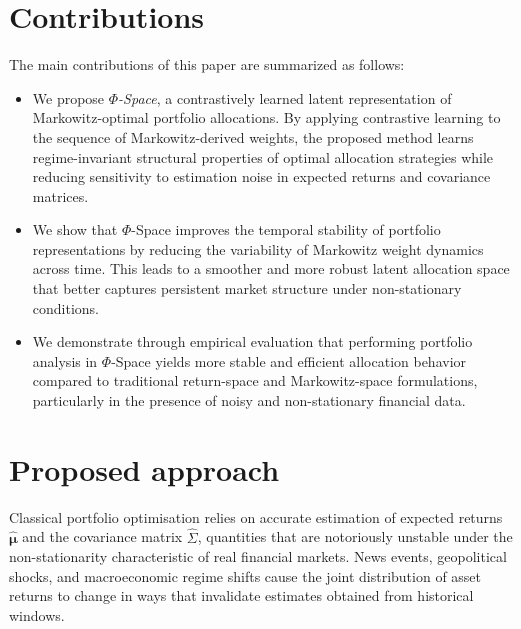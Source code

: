 \documentclass[preprint,12pt]{elsarticle}
\theoremstyle{plain}
\theoremstyle{definition}
\newcommand{\bmu}{\bm{\mu}}
\begin{document}
\section{Contributions}

The main contributions of this paper are summarized as follows:

\begin{itemize}

	
	\item We propose \emph{$\Phi$-Space}, a contrastively learned latent representation of Markowitz-optimal portfolio allocations. By applying contrastive learning to the sequence of Markowitz-derived weights, the proposed method learns regime-invariant structural properties of optimal allocation strategies while reducing sensitivity to estimation noise in expected returns and covariance matrices.
	
	\item We show that $\Phi$-Space improves the temporal stability of portfolio representations by reducing the variability of Markowitz weight dynamics across time. This leads to a smoother and more robust latent allocation space that better captures persistent market structure under non-stationary conditions.
	
	\item We demonstrate through empirical evaluation that performing portfolio analysis in $\Phi$-Space yields more stable and efficient allocation behavior compared to traditional return-space and Markowitz-space formulations, particularly in the presence of noisy and non-stationary financial data.
\end{itemize}




\section{Proposed approach}
\label{sec:overview}

Classical portfolio optimisation relies on accurate estimation of expected
returns $\hat{\bmu}$ and the covariance matrix $\hat{\Sigma}$, quantities that are
notoriously unstable under the non-stationarity characteristic of real financial
markets.  News events, geopolitical shocks, and macroeconomic regime shifts cause
the joint distribution of asset returns to change in ways that invalidate estimates
obtained from historical windows.
\end{document}
